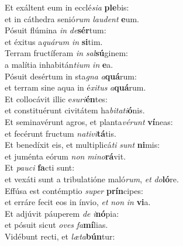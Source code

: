 \evenverse Et exáltent eum in ecclé\textit{si}\textit{a} \textbf{ple}bis:~\*\\
\evenverse et in cáthedra senió\textit{rum} \textit{lau}\textit{dent} \textbf{e}um.\\
\oddverse Pósuit flúmina \textit{in} \textit{de}\textbf{sér}tum:~\*\\
\oddverse et éxitus a\textit{quá}\textit{rum} \textit{in} \textbf{si}tim.\\
\evenverse Terram fructíferam \textit{in} \textit{sal}\textbf{sú}ginem:~\*\\
\evenverse a malítia inhabitán\textit{ti}\textit{um} \textit{in} \textbf{e}a.\\
\oddverse Pósuit desértum in sta\textit{gna} \textit{a}\textbf{quá}rum:~\*\\
\oddverse et terram sine aqua in é\textit{xi}\textit{tus} \textit{a}\textbf{quá}rum.\\
\evenverse Et collocávit illic e\textit{su}\textit{ri}\textbf{én}tes:~\*\\
\evenverse et constituérunt civitátem ha\textit{bi}\textit{ta}\textit{ti}\textbf{ó}nis.\\
\oddverse Et seminavérunt agros, et planta\textit{vé}\textit{runt} \textbf{ví}neas:~\*\\
\oddverse et fecérunt fructum \textit{na}\textit{ti}\textit{vi}\textbf{tá}tis.\\
\evenverse Et benedíxit eis, et multiplicá\textit{ti} \textit{sunt} \textbf{ni}mis:~\*\\
\evenverse et juménta eórum \textit{non} \textit{mi}\textit{no}\textbf{rá}vit.\\
\oddverse Et \textit{pau}\textit{ci} \textbf{fa}cti sunt:~\*\\
\oddverse et vexáti sunt a tribulatióne maló\textit{rum}, \textit{et} \textit{do}\textbf{ló}re.\\
\evenverse Effúsa est contémptio \textit{su}\textit{per} \textbf{prín}cipes:~\*\\
\evenverse et erráre fecit eos in ínvio, \textit{et} \textit{non} \textit{in} \textbf{vi}a.\\
\oddverse Et adjúvit páuperem \textit{de} \textit{i}\textbf{nó}pia:~\*\\
\oddverse et pósuit sicut \textit{o}\textit{ves} \textit{fa}\textbf{mí}lias.\\
\evenverse Vidébunt recti, et \textit{læ}\textit{ta}\textbf{bún}tur:~\*\\
